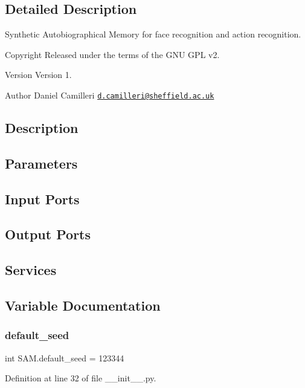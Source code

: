 \subsection{Detailed Description}
Synthetic Autobiographical Memory for face recognition and action recognition. 

\begin{DoxyCopyright}{Copyright}
Released under the terms of the G\+NU G\+PL v2. 
\end{DoxyCopyright}
\begin{DoxyVersion}{Version}
Version 1. 
\end{DoxyVersion}
\begin{DoxyAuthor}{Author}
Daniel Camilleri \href{mailto:d.camilleri@sheffield.ac.uk}{\tt d.\+camilleri@sheffield.\+ac.\+uk}
\end{DoxyAuthor}
\subsection*{Description }

\subsection*{Parameters }

\subsection*{Input Ports }

\subsection*{Output Ports }

\subsection*{Services }

\subsection{Variable Documentation}
\mbox{\label{group__icubclient__SAM__source_ga161f34370db931f9dc1648dddb17f44b}} 
\subsubsection{\texorpdfstring{default\+\_\+seed}{default\_seed}}
{\footnotesize\ttfamily int S\+A\+M.\+default\+\_\+seed = 123344}



Definition at line 32 of file \+\_\+\+\_\+init\+\_\+\+\_\+.\+py.

